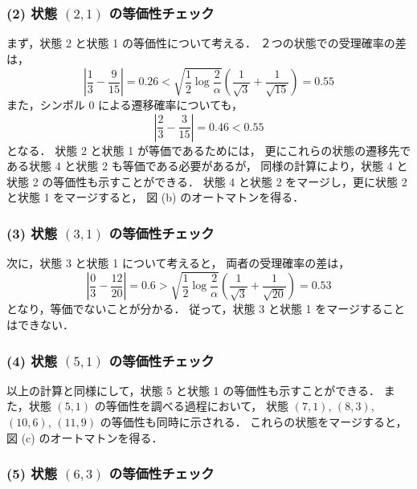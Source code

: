 \subsubsection*{(2) 状態 $(2,1)$ の等価性チェック}

まず，状態 2 と状態 1 の等価性について考える．
２つの状態での受理確率の差は，
\begin{equation}
        \left | \frac{1}{3} - \frac{9}{15} \right |     
        = 0.26 <
        \sqrt{\frac{1}{2} \log \frac{2}{\alpha}}
        \left ( \frac{1}{\sqrt{3}} + \frac{1}{\sqrt{15}} \right )
        = 0.55
\end{equation}
また，シンボル 0 による遷移確率についても，
\begin{equation}
        \left | \frac{2}{3} - \frac{3}{15} \right |
        = 0.46 < 0.55
\end{equation}
となる．
状態 2 と状態 1 が等価であるためには，
更にこれらの状態の遷移先である状態 4 と状態 2 も等価である必要があるが，
同様の計算により，状態 4 と状態 2 の等価性も示すことができる．
状態 4 と状態 2 をマージし，更に状態 2 と状態 1 をマージすると，
図 (b) のオートマトンを得る．

\subsubsection*{(3) 状態 $(3,1)$ の等価性チェック}

次に，状態 3 と状態 1 について考えると，
両者の受理確率の差は，
\begin{equation}
        \left | \frac{0}{3} - \frac{12}{20} \right |
        = 0.6
        >
        \sqrt{\frac{1}{2} \log \frac{2}{\alpha}}
        \left ( \frac{1}{\sqrt{3}} + \frac{1}{\sqrt{20}} \right )
        = 0.53
\end{equation}
となり，等価でないことが分かる．
従って，状態 3 と状態 1 をマージすることはできない．

\subsubsection*{(4) 状態 $(5,1)$ の等価性チェック}

以上の計算と同様にして，状態 5 と状態 1 の等価性も示すことができる．
また，状態 $(5,1)$ の等価性を調べる過程において，
状態 $(7,1)$, $(8,3)$, $(10,6)$, $(11,9)$ の等価性も同時に示される．
これらの状態をマージすると，
図 (c) のオートマトンを得る．

\subsubsection*{(5) 状態 $(6,3)$ の等価性チェック}

